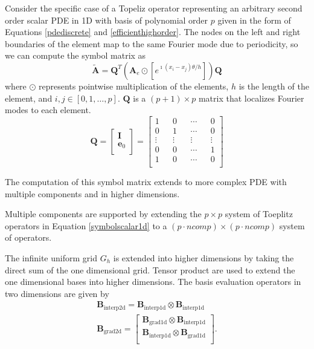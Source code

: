\documentclass[review]{siamart190516}
\begin{document}
Consider the specific case of a Topeliz operator representing an arbitrary second order scalar PDE in 1D with basis of polynomial order $p$ given in the form of Equations \ref{pdediscrete} and \ref{efficienthighorder}.
The nodes on the left and right boundaries of the element map to the same Fourier mode due to periodicity, so we can compute the symbol matrix as
\begin{equation}\label{symbolscalar1d}
\tilde{\mathbf{A}} = \mathbf{Q}^T \left( \mathbf{A}_e \odot \left[ e^{\imath \left( x_i - x_j \right) \theta / h} \right] \right) \mathbf{Q}
\end{equation}
where $\odot$ represents pointwise multiplication of the elements, $h$ is the length of the element, and $i, j \in \left[ 0, 1, \dots, p\right]$.
$\mathbf{Q}$ is a $\left( p + 1 \right) \times p$ matrix that localizes Fourier modes to each element.
\begin{equation}
\mathbf{Q} =
\begin{bmatrix}
    \mathbf{I}   \\
    \mathbf{e}_0 \\
\end{bmatrix} =
\begin{bmatrix}
    1      && 0      && \cdots && 0      \\
    0      && 1      && \cdots && 0      \\
    \vdots && \vdots && \vdots && \vdots \\
    0      && 0      && \cdots && 1      \\
    1      && 0      && \cdots && 0      \\
\end{bmatrix}
\end{equation}

The computation of this symbol matrix extends to more complex PDE with multiple components and in higher dimensions.

Multiple components are supported by extending the $p \times p$ system of Toeplitz operators in Equation \ref{symbolscalar1d} to a $\left( p \cdot ncomp \right) \times \left( p \cdot ncomp \right)$ system of operators.

The infinite uniform grid $G_h$ is extended into higher dimensions by taking the direct sum of the one dimensional grid.
Tensor product are used to extend the one dimensional bases into higher dimensions.
The basis evaluation operators in two dimensions are given by
\begin{equation}
\begin{split}
\mathbf{B}_{\text{interp2d}} = \mathbf{B}_{\text{interp1d}} \otimes \mathbf{B}_{\text{interp1d}} \\
\mathbf{B}_{\text{grad2d}} =
\begin{bmatrix}
    \mathbf{B}_{\text{grad1d}} \otimes \mathbf{B}_{\text{interp1d}} \\
    \mathbf{B}_{\text{interp1d}} \otimes \mathbf{B}_{\text{grad1d}} \\
\end{bmatrix}.
\end{split}
\end{equation}
\end{document}
